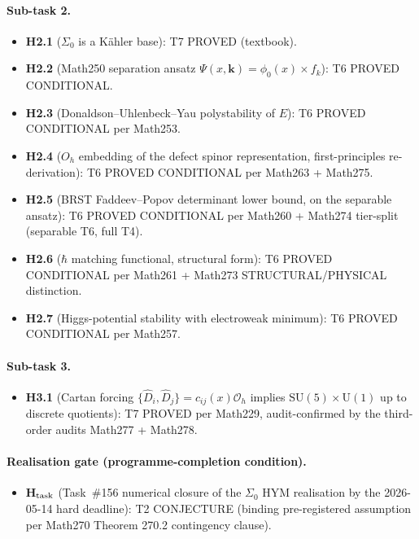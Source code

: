 \paragraph{Sub-task 2.}
\begin{itemize}
\item \textbf{H2.1} ($\Sigma_0$ is a Kähler base): T7 PROVED
(textbook).
\item \textbf{H2.2} (Math250 separation ansatz $\Psi(x,\mathbf{k}) =
\phi_0(x) \times f_k$): T6 PROVED CONDITIONAL.
\item \textbf{H2.3} (Donaldson--Uhlenbeck--Yau polystability of $E$):
T6 PROVED CONDITIONAL per Math253.
\item \textbf{H2.4} ($O_h$ embedding of the defect spinor
representation, first-principles re-derivation): T6 PROVED
CONDITIONAL per Math263 + Math275.
\item \textbf{H2.5} (BRST Faddeev--Popov determinant lower bound, on
the separable ansatz): T6 PROVED CONDITIONAL per Math260 +
Math274 tier-split (separable T6, full T4).
\item \textbf{H2.6} ($\hbar$ matching functional, structural form):
T6 PROVED CONDITIONAL per Math261 + Math273 STRUCTURAL/PHYSICAL
distinction.
\item \textbf{H2.7} (Higgs-potential stability with electroweak
minimum): T6 PROVED CONDITIONAL per Math257.
\end{itemize}

\paragraph{Sub-task 3.}
\begin{itemize}
\item \textbf{H3.1} (Cartan forcing $\{\hat{D}_i,\hat{D}_j\} =
c_{ij}(x) \mathcal{O}_h$ implies $\mathrm{SU}(5) \times
\mathrm{U}(1)$ up to discrete quotients): T7 PROVED per Math229,
audit-confirmed by the third-order audits Math277 + Math278.
\end{itemize}

\paragraph{Realisation gate (programme-completion condition).}
\begin{itemize}
\item \textbf{H$_{\rm task}$} (Task~\#156 numerical closure of the
$\Sigma_0$ HYM realisation by the 2026-05-14 hard deadline): T2
CONJECTURE (binding pre-registered assumption per Math270 Theorem
270.2 contingency clause).
\end{itemize}

